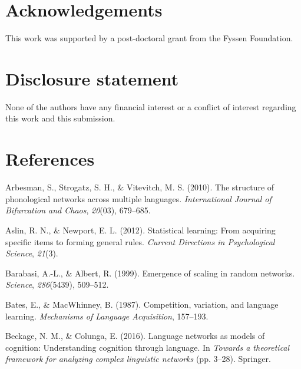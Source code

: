 \documentclass[english,floatsintext,man]{apa6}
\theoremstyle{definition}
\theoremstyle{definition}
\theoremstyle{definition}
\theoremstyle{remark}
\begin{document}
\vspace{1em}

\section{Acknowledgements}\label{acknowledgements}

This work was supported by a post-doctoral grant from the Fyssen
Foundation.

\section{Disclosure statement}\label{disclosure-statement}

None of the authors have any financial interest or a conflict of
interest regarding this work and this submission.

\section{References}\label{references}

\setlength{\parindent}{-0.5in} \setlength{\leftskip}{0.5in}

\hypertarget{refs}{}
\hypertarget{ref-arbesman2010}{}
Arbesman, S., Strogatz, S. H., \& Vitevitch, M. S. (2010). The structure
of phonological networks across multiple languages. \emph{International
Journal of Bifurcation and Chaos}, \emph{20}(03), 679--685.

\hypertarget{ref-aslin2012}{}
Aslin, R. N., \& Newport, E. L. (2012). Statistical learning: From
acquiring specific items to forming general rules. \emph{Current
Directions in Psychological Science}, \emph{21}(3).

\hypertarget{ref-barabasi99}{}
Barabasi, A.-L., \& Albert, R. (1999). Emergence of scaling in random
networks. \emph{Science}, \emph{286}(5439), 509--512.

\hypertarget{ref-bates1987}{}
Bates, E., \& MacWhinney, B. (1987). Competition, variation, and
language learning. \emph{Mechanisms of Language Acquisition}, 157--193.

\hypertarget{ref-beckage2016}{}
Beckage, N. M., \& Colunga, E. (2016). Language networks as models of
cognition: Understanding cognition through language. In \emph{Towards a
theoretical framework for analyzing complex linguistic networks} (pp.
3--28). Springer.
\end{document}
